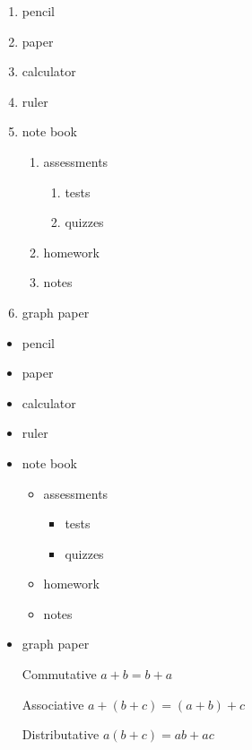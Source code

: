 \documentclass{article}
\begin{document}
\begin{enumerate}
\item pencil
\item paper
\item calculator
\item ruler
\item note book
  \begin{enumerate}
  \item assessments
    \begin{enumerate}
    \item tests
    \item quizzes
    \end{enumerate}
  \item homework
  \item notes
  \end{enumerate}
\item graph paper
\end{enumerate}

\begin{itemize}
\item pencil
\item paper
\item calculator
\item ruler
\item note book
  \begin{itemize}
  \item assessments
    \begin{itemize}
    \item tests
    \item quizzes
    \end{itemize}
  \item homework
  \item notes
  \end{itemize}
\item graph paper
\end{itemize}

\begin{enumerate}
  \item[Commutative] $a+b=b+a$
  \item[Associative] $a+(b+c)=(a+b)+c$
  \item[Distributative] $a(b+c)=ab+ac$


\end{enumerate}
\end{document}
